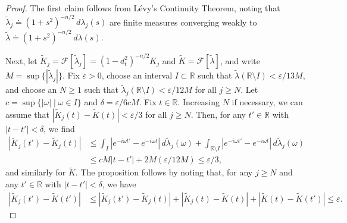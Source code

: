 \documentclass{cams-l} %
\newcommand{\dave}[1]{#1}\newcommand{\davebegin}{}\newcommand{\daveend}{}\newcommand{\george}[1]{#1}
\newcommand{\RR}{\mathbb R}
\newcommand{\cF}{\mathcal F}
\newcommand{\eps}{\varepsilon}
\theoremstyle{definition}
\theoremstyle{remark}
\numberwithin{equation}{section}
\begin{document}
\begin{proof}
    \dave{The first claim follows from L\'evy's Continuity Theorem, noting that $\widetilde{\lambda}_j\doteq (1+s^2)^{-n/2}\,d\lambda_j(s)$ are finite measures converging weakly to $\widetilde{\lambda}\doteq(1+s^2)^{-n/2}\,d\lambda(s)$}.
    
    \dave{Next, let $\widetilde{K}_j = \cF[\widetilde{\lambda}_j] = (1-d_t^2)^{-n/2}K_j$ and $\widetilde{K} = \cF[\widetilde{\lambda}]$, and write $M = \sup\{|\widetilde{\lambda}_j|\}$. Fix $\eps>0$, choose an interval $I\subset\RR$ such that $\widetilde{\lambda}(\RR\setminus I)<\eps/13M$, and choose an $N\geq 1$ such that $\widetilde{\lambda}_j(\RR\setminus I)<\eps/12M$ for all $j\geq N$. Let $c=\sup\{|\omega|\;|\;\omega\in I\}$ and $\delta = \eps/6cM$. Fix $t\in\RR$. Increasing $N$ if necessary, we can assume that $|\widetilde{K}_j(t)-\widetilde{K}(t)|<\eps/3$ for all $j\geq N$. Then, for any $t'\in\RR$ with $|t-t'|<\delta$, we find
    \begin{align*}|\widetilde{K}_j(t') - \widetilde{K}_j(t)| &\leq \int_{I} |e^{-i\omega t'} - e^{-i\omega t}|\,d\widetilde{\lambda}_j(\omega) + \int_{\RR\setminus I} |e^{-i\omega t'} - e^{-i\omega t}|\,d\widetilde{\lambda}_j(\omega)\\
    &\leq cM|t-t'| + 2M(\eps/12M) \leq \eps/3,
    \end{align*}
    and similarly for $\widetilde{K}$. The proposition follows by noting that, for any $j\geq N$ and any $t'\in\RR$ with $|t-t'|<\delta$, we have 
    \begin{align*}|\widetilde{K}_j(t') - \widetilde{K}(t')|&\leq |\widetilde{K}_j(t') - \widetilde{K}_j(t)| + |\widetilde{K}_j(t) - \widetilde{K}(t)| + |\widetilde{K}(t) - \widetilde{K}(t')|\leq \eps.
    \end{align*}}
\end{proof}
\end{document}
